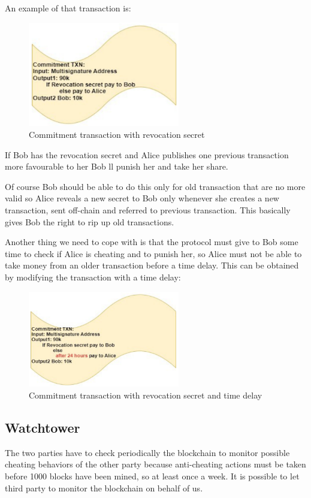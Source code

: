 An example of that transaction is:
\begin{figure}[H]
    \centering
    \includegraphics[width=250px]{images/10_Scaling_blockchain/03.png}
    \caption{Commitment transaction with revocation secret}
\end{figure}
If Bob has the revocation secret and Alice publishes one previous transaction more favourable to her Bob ll punish her and take her share.

Of course Bob should be able to do this only for old transaction that are no more valid so Alice reveals a new secret to Bob only whenever she creates a new transaction, sent off-chain and referred to previous transaction.
This basically gives Bob the right to rip up old transactions.

Another thing we need to cope with is that the protocol must give to Bob some time to check if Alice is cheating and to punish her, so Alice must not be able to take money from an older transaction before a time delay.
This can be obtained by modifying the transaction with a time delay:
\begin{figure}[H]
    \centering
    \includegraphics[width=250px]{images/10_Scaling_blockchain/04.png}
    \caption{Commitment transaction with revocation secret and time delay}
\end{figure}

\subsection{Watchtower}
The two parties have to check periodically the blockchain to monitor possible cheating behaviors of the other party because anti-cheating actions must be taken before 1000 blocks have been mined, so at least once a week.
It is possible to let third party to monitor the blockchain on behalf of us.

